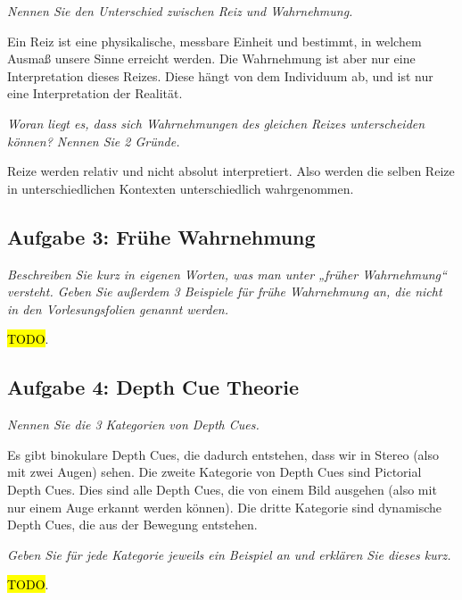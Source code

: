 \documentclass[
  ngerman,
  DIV=14
]{scrartcl}
\begin{document}
\bigskip\noindent
\emph{Nennen Sie den Unterschied zwischen Reiz und Wahrnehmung.}
\par\medskip\noindent
Ein Reiz ist eine physikalische, messbare Einheit und bestimmt, in welchem Ausmaß unsere Sinne erreicht werden. Die Wahrnehmung ist aber nur eine Interpretation dieses Reizes. Diese hängt von dem Individuum ab, und ist nur eine Interpretation der Realität.

\bigskip\noindent
\emph{Woran liegt es, dass sich Wahrnehmungen des gleichen Reizes unterscheiden können? Nennen Sie 2 Gründe.}
\par\medskip\noindent
Reize werden relativ und nicht absolut interpretiert. Also werden die selben Reize in unterschiedlichen Kontexten unterschiedlich wahrgenommen.

\subsection*{Aufgabe 3: Frühe Wahrnehmung}
\emph{Beschreiben Sie kurz in eigenen Worten, was man unter „früher Wahrnehmung“ versteht. Geben Sie außerdem 3 Beispiele für frühe Wahrnehmung an, die nicht in den Vorlesungsfolien genannt werden.}
\par\medskip\noindent
\hl{TODO}.

\subsection*{Aufgabe 4: Depth Cue Theorie}
\emph{Nennen Sie die 3 Kategorien von Depth Cues.}
\par\medskip\noindent
Es gibt binokulare Depth Cues, die dadurch entstehen, dass wir in Stereo (also mit zwei Augen) sehen. Die zweite Kategorie von Depth Cues sind Pictorial Depth Cues. Dies sind alle Depth Cues, die von einem Bild ausgehen (also mit nur einem Auge erkannt werden können). Die dritte Kategorie sind dynamische Depth Cues, die aus der Bewegung entstehen.

\bigskip\noindent
\emph{Geben Sie für jede Kategorie jeweils ein Beispiel an und erklären Sie dieses kurz.}
\par\medskip\noindent
\hl{TODO}.
\end{document}
